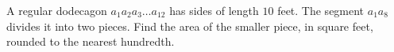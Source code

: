 A regular dodecagon $a_1a_2a_3\ldots a_{12}$ has sides of length $10$ feet. The segment $a_1a_8$ divides it into two pieces. Find the area of the smaller piece, in square feet, rounded to the nearest hundredth.
